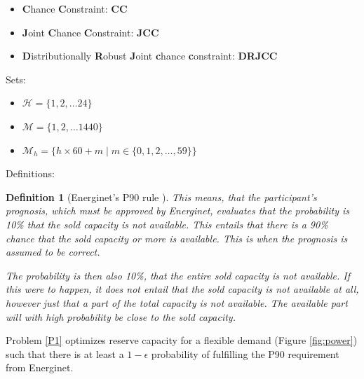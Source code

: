 \documentclass{report}
\newtheorem{definition}{Definition}
\begin{document}
\begin{itemize}
    \item \textbf{C}hance \textbf{C}onstraint: \textbf{CC}
    \item \textbf{J}oint \textbf{C}hance \textbf{C}onstraint: \textbf{JCC}
    \item \textbf{D}istributionally \textbf{R}obust \textbf{J}oint \textbf{c}hance \textbf{c}onstraint: \textbf{DRJCC}
\end{itemize}

\noindent Sets:

\begin{itemize}
    \item $\mathcal{H} = \{1, 2,  \ldots 24\}$
    \item $\mathcal{M} = \{1, 2,  \ldots 1440\}$
    \item $ \mathcal{M}_{h} = \{h \times 60 + m \mid m \in \{0, 1, 2, \ldots, 59\}\}$

\end{itemize}

\noindent Definitions:

\begin{definition}[Energinet's P90 rule \cite{energinet}]
    This means, that the participant's prognosis, which must be approved by Energinet, evaluates that the probability is 10\% that the sold capacity is not available. This entails that there is a 90\% chance that the sold capacity or more is available. This is when the prognosis is assumed to be correct.

    The probability is then also 10\%, that the entire sold capacity is not available. If this were to happen, it does not entail that the sold capacity is not available at all, however just that a part of the total capacity is not available. The available part will with high probability be close to the sold capacity.
\end{definition}


\noindent Problem \ref{P1} optimizes reserve capacity for a flexible demand (Figure \ref{fig:power}) such that there is at least a $1-\epsilon$ probability of fulfilling the P90 requirement from Energinet.
\end{document}
